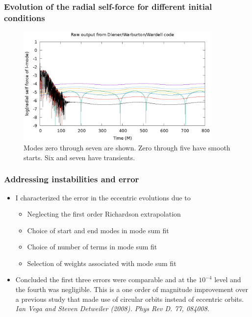 \documentclass{beamer}
\begin{document}
\begin{frame}
  \frametitle{Evolution of the radial self-force for different initial conditions}
  \begin{figure}
  \includegraphics[width=0.9\textwidth]{rawRadialSelForceModes}
  \caption{Modes zero through seven are shown. Zero through five have smooth starts. Six and seven have transients.}
  \end{figure}
\end{frame}

\begin{frame}
  \frametitle{Addressing instabilities and error}
  \begin{itemize}
  \item I characterized the error in the eccentric evolutions due to
    \begin{itemize}
    \item Neglecting the first order Richardson extrapolation
    \item Choice of start and end modes in mode sum fit
    \item Choice of number of terms in mode sum fit
    \item Selection of weights associated with mode sum fit
    \end{itemize}
  \item Concluded the first three errors were comparable and at the $10^{-4}$ level and the fourth was negligible. This is a one order of magnitude improvement over a previous study that made use of circular orbits instead of eccentric orbits. {\em Ian Vega and Steven Detweiler (2008). Phys Rev D. 77, 084008.}
  \end{itemize}
\end{frame}
\end{document}
